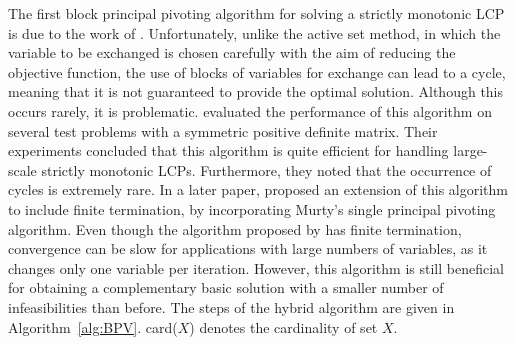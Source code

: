 \documentclass[11pt]{article}
\newcommand{\0}{\phantom{0}}
\begin{document}
The first block principal pivoting algorithm for solving a strictly monotonic LCP is due to the work of \citet{Kost1978}. Unfortunately, unlike the active set method, in which the variable to be exchanged is chosen carefully with the aim of reducing the objective function, the use of blocks of variables for exchange can lead to a cycle, meaning that it is not guaranteed to provide the optimal solution. Although this occurs rarely, it is problematic. \citet{Judice1989} evaluated the performance of this algorithm on several test problems with a symmetric positive definite matrix. Their experiments concluded that this algorithm is quite efficient for handling large-scale strictly monotonic LCPs. Furthermore, they noted that the occurrence of cycles is extremely rare. In a later paper, \citet{Judice1994} proposed an extension of this algorithm to include finite termination, by incorporating Murty's single principal pivoting algorithm. Even though the algorithm proposed by \citet{Murty1974} has finite termination, convergence can be slow for applications with large numbers of variables, as it changes only one variable per iteration. However, this algorithm is still beneficial for obtaining a complementary basic solution with a smaller number of infeasibilities than before. The steps of the hybrid algorithm are given in Algorithm~\ref{alg:BPV}. card($X$) denotes the cardinality of set $X$.
      
\end{document}
